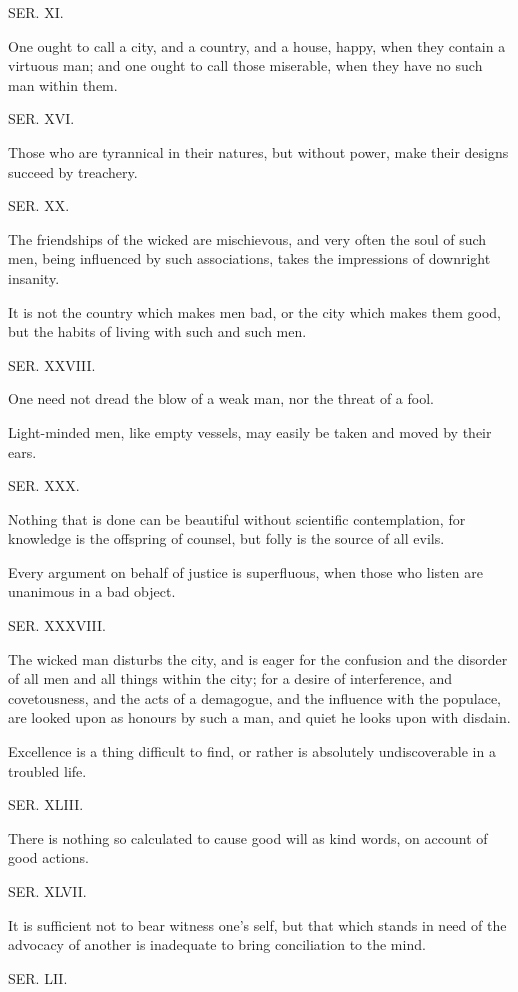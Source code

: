 SER. XI.

One ought to call a city, and a country, and a house, happy, when they contain a virtuous man; and
one ought to call those miserable, when they have no such man within them.

SER. XVI.

Those who are tyrannical in their natures, but without power, make their designs succeed by
treachery.

SER. XX.

The friendships of the wicked are mischievous, and very often the soul of such men, being
influenced by such associations, takes the impressions of downright insanity.

It is not the country which makes men bad, or the city which makes them good, but the habits of
living with such and such men.

SER. XXVIII.

One need not dread the blow of a weak man, nor the threat of a fool.

Light-minded men, like empty vessels, may easily be taken and moved by their ears.

SER. XXX.

Nothing that is done can be beautiful without scientific contemplation, for knowledge is the offspring
of counsel, but folly is the source of all evils.

Every argument on behalf of justice is superfluous, when those who listen are unanimous in a bad
object.

SER. XXXVIII.

The wicked man disturbs the city, and is eager for the confusion and the disorder of all men and all
things within the city; for a desire of interference, and covetousness, and the acts of a
demagogue, and the influence with the populace, are looked upon as honours by such a man, and
quiet he looks upon with disdain.

Excellence is a thing difficult to find, or rather is absolutely undiscoverable in a troubled life.

SER. XLIII.

There is nothing so calculated to cause good will as kind words, on account of good actions.

SER. XLVII.

It is sufficient not to bear witness one's self, but that which stands in need of the advocacy of
another is inadequate to bring conciliation to the mind.

SER. LII.

